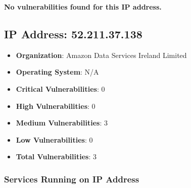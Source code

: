 \documentclass{article}
\begin{document}
\textbf{No vulnerabilities found for this IP address.}




\clearpage



\subsection*{IP Address: 52.211.37.138}

\begin{itemize}
    \item \textbf{Organization}: Amazon Data Services Ireland Limited
    \item \textbf{Operating System}:  N/A 
    \item \textbf{Critical Vulnerabilities}: 0
    \item \textbf{High Vulnerabilities}: 0
    \item \textbf{Medium Vulnerabilities}: 3
    \item \textbf{Low Vulnerabilities}: 0
    \item \textbf{Total Vulnerabilities}: 3
\end{itemize}

\subsubsection*{Services Running on IP Address}
\end{document}
